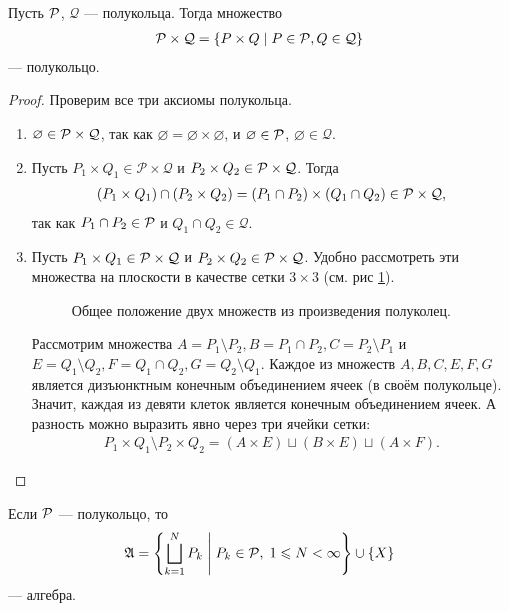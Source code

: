 \begin{lm}
 \label{lemma:product_of_semirings_is_semiring}
 Пусть  $\mathcal{P}$, $\mathcal{Q}$ --- полукольца. Тогда множество \begin{align*}
  \mathcal{P} \times \mathcal{Q} = \left\{ P \times Q \;\middle|\; P \in \mathcal{P}, Q \in \mathcal{Q} \right\}
 \end{align*}  --- полукольцо.
\end{lm}
\begin{proof}
 Проверим все три аксиомы полукольца.
 \begin{enumerate}
  \item $\varnothing \in \mathcal{P} \times \mathcal{Q}$, так как $\varnothing = \varnothing \times \varnothing$, и $\varnothing \in \mathcal{P}$, $\varnothing \in \mathcal{Q}$.
  \item Пусть $P_1 \times Q_1 \in \mathcal{P} \times \mathcal{Q}$ и  $P_2 \times Q_2 \in \mathcal{P} \times \mathcal{Q}$. Тогда \begin{align*}
    (P_1 \times Q_1) \cap (P_2 \times Q_2) = (P_1 \cap P_2) \times (Q_1 \cap Q_2) \in \mathcal{P} \times \mathcal{Q}
   ,\end{align*} так как $P_1 \cap P_2 \in \mathcal{P}$ и $Q_1 \cap Q_2 \in \mathcal{Q}$.
  \item Пусть $P_1 \times Q_1 \in \mathcal{P} \times \mathcal{Q}$ и $P_2 \times Q_2 \in \mathcal{P} \times \mathcal{Q}$. Удобно рассмотреть эти множества на плоскости в качестве сетки $3 \times 3$ (см. рис \ref{fig:semiring-product-set-difference}).
   \begin{figure}[ht]
    \centering
    \caption{Общее положение двух множеств из произведения полуколец.}
    \label{fig:semiring-product-set-difference}
   \end{figure}
   Рассмотрим множества $A = P_1 \setminus P_2, B = P_1 \cap P_2, C = P_2 \setminus P_1$ и $E = Q_1 \setminus Q_2, F = Q_1 \cap Q_2, G = Q_2 \setminus Q_1$. Каждое из множеств $A, B, C, E, F, G$ является дизъюнктным конечным объединением ячеек (в своём полукольце). Значит, каждая из девяти клеток является конечным объединением ячеек. А разность можно выразить явно через три ячейки сетки: \begin{align*}
    P_1 \times Q_1 \setminus P_2 \times Q_2 = (A \times E) \sqcup (B \times E) \sqcup (A \times F)
   .\end{align*}
 \end{enumerate}
\end{proof}
\begin{lm}
 Если $\mathcal{P}$ --- полукольцо, то \begin{align*}
  \mathfrak{A} = \left\{ \bigsqcup_{k=1}^{N} P_k \;\middle|\; P_k \in \mathcal{P},\; 1 \leqslant N < \infty \right\} \cup \left\{ X \right\}
 \end{align*}  --- алгебра.
\end{lm}
